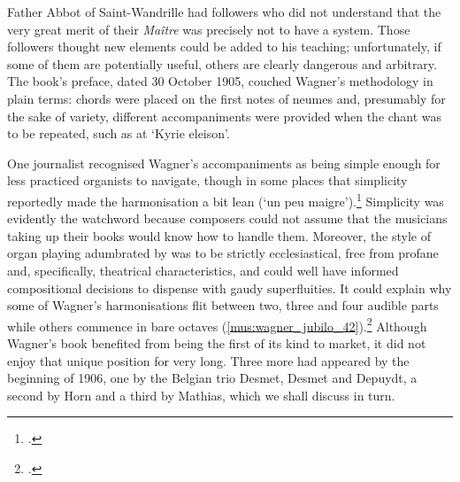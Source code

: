   {\cite[p.~iii]{WagnerOrdinariumMissaejuxta1905}}
{Father Abbot of Saint-Wandrille had followers who did not understand that the very great merit of their \emph{Maître} was precisely not to have a system. Those followers thought new elements could be added to his teaching; unfortunately, if some of them are potentially useful, others are clearly dangerous and arbitrary.}
\noindent
The book's preface, dated 30 October 1905, couched Wagner's methodology in plain terms: chords were placed on the first notes of neumes and, presumably for the sake of variety, different accompaniments were provided when the chant was to be repeated, such as at `Kyrie eleison'.

One journalist recognised Wagner's accompaniments as being simple enough for less practiced organists to navigate, though in some places that simplicity reportedly made the harmonisation a bit lean (`un peu maigre').\footcite[77]{Bibliographiegregorienneeditions1905}
Simplicity was evidently the watchword because composers could not assume that the musicians taking up their books would know how to handle them.
Moreover, the style of organ playing adumbrated by \tls{} was to be strictly ecclesiastical, free from profane and, specifically, theatrical characteristics, and could well have informed compositional decisions to dispense with gaudy superfluities.
\label{ln:wagner_bareoctaves_jubilo}%
It could explain why some of Wagner's harmonisations flit between two, three and four audible parts while others commence in bare octaves (\cref{mus:wagner_jubilo_42}).\footcite[42]{WagnerOrdinariumMissaejuxta1905}
Although Wagner's book benefited from being the first of its kind to market, it did not enjoy that unique position for very long.
Three more had appeared by the beginning of 1906, one by the Belgian trio Desmet, Desmet and Depuydt, a second by Horn and a third by Mathias, which we shall discuss in turn.

